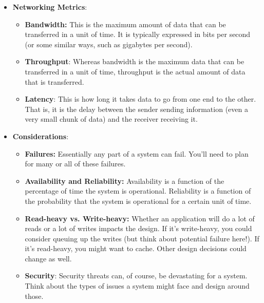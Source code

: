 \documentclass{report}
\begin{document}
\begin{itemize}
            \bigbreak \noindent 
            In some cases, we can do this in advance (i.e., we can pre-process). For example, we might have a queue of jobs to be done that update some part of the website. If we were running a forum, one of these jobs might be to re-render a page that lists the most popular posts and the number of comments. That list might end up being slightly out of date, but that's perhaps okay. It's better than a user stuck waiting on the website to load simply because someone added a new comment and invalidated the cached version of this page.
            \bigbreak \noindent 
            In other cases, we might tell the user to wait and notify them when the process is done. You've probably seen this on websites before. Perhaps you enabled some new part of a website and it says it needs a few minutes to import your data, but you'll get a notification when it's done.
        \item \textbf{Networking Metrics}: 
            \begin{itemize}
                \item \textbf{Bandwidth:} This is the maximum amount of data that can be transferred in a unit of time. It is typically expressed in bits per second (or some similar ways, such as gigabytes per second).
                \item \textbf{Throughput}: Whereas bandwidth is the maximum data that can be transferred in a unit of time, throughput is the actual amount of data that is transferred.
                \item \textbf{Latency}: This is how long it takes data to go from one end to the other. That is, it is the delay between the sender sending information (even a very small chunk of data) and the receiver receiving it.
            \end{itemize}
        \item \textbf{Considerations}: 
            \begin{itemize}
                \item \textbf{Failures:} Essentially any part of a system can fail. You'll need to plan for many or all of these failures.
                \item \textbf{Availability and Reliability:} Availability is a function of the percentage of time the system is operational. Reliability is a function of the probability that the system is operational for a certain unit of time.
                \item \textbf{Read-heavy vs. Write-heavy:} Whether an application will do a lot of reads or a lot of writes impacts the design. If it's write-heavy, you could consider queuing up the writes (but think about potential failure here!). If it's read-heavy, you might want to cache. Other design decisions could change as well.
                \item \textbf{Security}: Security threats can, of course, be devastating for a system. Think about the types of issues a system might face and design around those.
            \end{itemize}


    \end{itemize}
\end{document}
